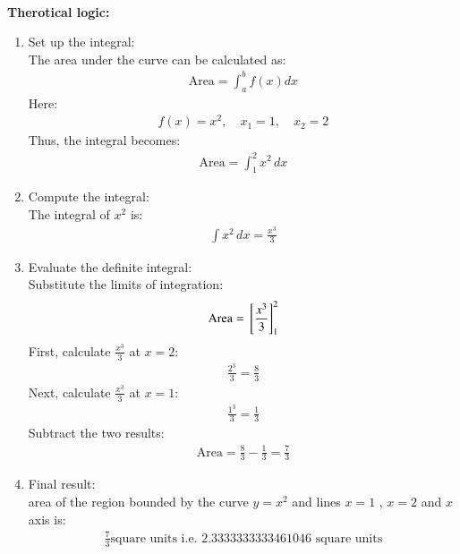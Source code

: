 \documentclass[journal]{IEEEtran}
\begin{document}
\solution\\
\textbf{Therotical logic:}
\begin{enumerate}
    \item Set up the integral: \\
    The area under the curve can be calculated as:
    \begin{align}
          \text{Area}=\int_{a}^{b}f(x)dx
    \end{align}
    Here:
    \begin{align}
    f(x) = x^2, \quad x_1 = 1, \quad x_2 = 2
    \end{align}
    Thus, the integral becomes:
    \begin{align}
    \text{Area} = \int_{1}^{2} x^2 \, dx
    \end{align}
    \item Compute the integral: \\
    The integral of $x^2$ is:
    \begin{align}
    \int x^2 \, dx = \frac{x^3}{3}
    \end{align}
    \item Evaluate the definite integral: \\
    Substitute the limits of integration:
    \begin{align}
    \text{Area} = {}\left[\frac{x^3}{3}\right]_1^2
    \end{align}
    First, calculate $\frac{x^3}{3}$ at $x=2$:
    \begin{align}
    \frac{2^3}{3} = \frac{8}{3}
    \end{align}
    Next, calculate $\frac{x^3}{3}$ at $x=1$:
    \begin{align}
    \frac{1^3}{3} = \frac{1}{3}
    \end{align}
    Subtract the two results:
    \begin{align}
    \text{Area} = \frac{8}{3} - \frac{1}{3} = \frac{7}{3}
    \end{align}

    \item Final result: \\
    area of the region bounded by the curve $y=x^2$ and lines $x=1$ , $x=2$ and $x$ axis is:    \begin{align}
    \frac{7}{3}\text{square units i.e. } 2.3333333333461046
\text{ square units}
    \end{align}
    

\end{enumerate}
\end{document}
